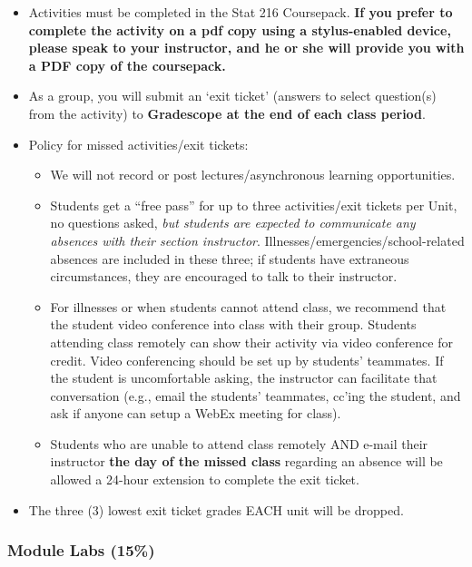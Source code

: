 \documentclass[
]{article}
\providecommand{\tightlist}{%
  \setlength{\itemsep}{0pt}\setlength{\parskip}{0pt}}
\begin{document}
\begin{itemize}
\tightlist
\item
  Activities must be completed in the Stat 216 Coursepack. \textbf{If
  you prefer to complete the activity on a pdf copy using a
  stylus-enabled device, please speak to your instructor, and he or she
  will provide you with a PDF copy of the coursepack.}
\item
  As a group, you will submit an `exit ticket' (answers to select
  question(s) from the activity) to \textbf{Gradescope at the end of
  each class period}.
\item
  Policy for missed activities/exit tickets:

  \begin{itemize}
  \tightlist
  \item
    We will not record or post lectures/asynchronous learning
    opportunities.
  \item
    Students get a ``free pass'' for up to three activities/exit tickets
    per Unit, no questions asked, \emph{but students are expected to
    communicate any absences with their section instructor}.
    Illnesses/emergencies/school-related absences are included in these
    three; if students have extraneous circumstances, they are
    encouraged to talk to their instructor.
  \item
    For illnesses or when students cannot attend class, we recommend
    that the student video conference into class with their group.
    Students attending class remotely can show their activity via video
    conference for credit. Video conferencing should be set up by
    students' teammates. If the student is uncomfortable asking, the
    instructor can facilitate that conversation (e.g., email the
    students' teammates, cc'ing the student, and ask if anyone can setup
    a WebEx meeting for class).
  \item
    Students who are unable to attend class remotely AND e-mail their
    instructor \textbf{the day of the missed class} regarding an absence
    will be allowed a 24-hour extension to complete the exit ticket.
  \end{itemize}
\item
  The three (3) lowest exit ticket grades EACH unit will be dropped.
\end{itemize}

\subsubsection{Module Labs (15\%)}\label{module-labs-15}
\end{document}
